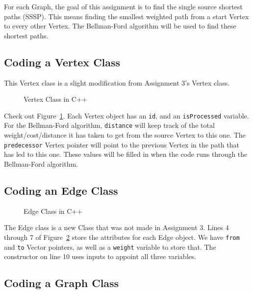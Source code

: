 \documentclass[letterpaper, 10pt,DIV=13]{scrartcl}
\numberwithin{equation}{section} %
\numberwithin{figure}{section} %
\numberwithin{table}{section} %
\begin{document}
For each Graph, the goal of this assignment is to find the single source shortest paths (SSSP). This means finding the smallest weighted path from a start Vertex to every other Vertex. The Bellman-Ford algorithm will be used to find these shortest paths.  

\pagebreak

\subsection{Coding a Vertex Class}
This Vertex class is a slight modification from Assignment 3's Vertex class.

\begin{figure}[ht] 
    \centering 
    
    \caption{Vertex Class in C++}
    \label{figure:VertexClass}
\end{figure}


Check out Figure~\ref{figure:VertexClass}. Each Vertex object has an \texttt{id}, and an \texttt{isProcessed} variable. For the Bellman-Ford algorithm, \texttt{distance} will keep track of the total weight/cost/distance it has taken to get from the source Vertex to this one. The \texttt{predecessor} Vertex pointer will point to the previous Vertex in the path that has led to this one. These values will be filled in when the code runs through the Bellman-Ford algorithm.


\subsection{Coding an Edge Class}


\begin{figure}[ht] 
    \centering 
    
    \caption{Edge Class in C++}
    \label{figure:EdgeClass}
\end{figure}


The Edge class is a new Class that was not made in Assignment 3. Lines 4 through 7 of Figure~\ref{figure:EdgeClass}  store the attributes for each Edge object. We have \texttt{from} and \texttt{to} Vector pointers, as well as a \texttt{weight} variable to store that. The constructor on line 10 uses inputs to appoint all three variables.

\pagebreak



\subsection{Coding a Graph Class}
\end{document}
